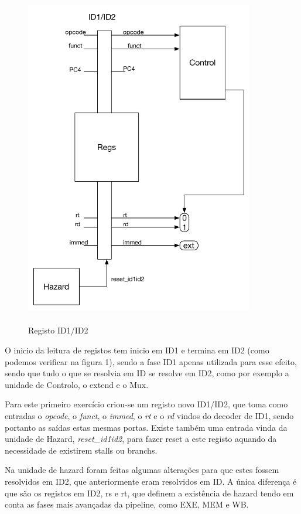 \documentclass[pdftex,12pt,a4paper]{report}
\begin{document}
\begin{figure}[!htb]
\center
 \includegraphics[width=100mm,scale=1]{ID1ID2ex1.pdf}
 \caption{\\ Registo ID1/ID2}
 \label{fig:eer}
\end{figure}

O inicio da leitura de registos tem inicio em ID1 e termina em ID2 (como podemos verificar na figura 1), sendo a fase ID1 apenas utilizada para esse efeito, sendo que tudo o que se resolvia em ID se resolve em ID2, como por exemplo a unidade de Controlo, o extend e o Mux.

Para este primeiro exercício criou-se um registo novo ID1/ID2, que toma como entradas o \textit{opcode}, o \textit{funct}, o \textit{immed}, o \textit{rt} e o \textit{rd} vindos do decoder de ID1, sendo portanto as saídas estas mesmas portas. Existe também uma entrada vinda da unidade de Hazard, \textit{reset\_id1id2}, para fazer reset a este registo aquando da necessidade de existirem stalls ou branchs.

Na unidade de hazard foram feitas algumas alterações para que estes fossem resolvidos em ID2, que anteriormente eram resolvidos em ID. A única diferença é que são os registos em ID2, rs e rt, que definem a existência de hazard tendo em conta as fases mais avançadas da pipeline, como EXE, MEM e WB.
\end{document}
